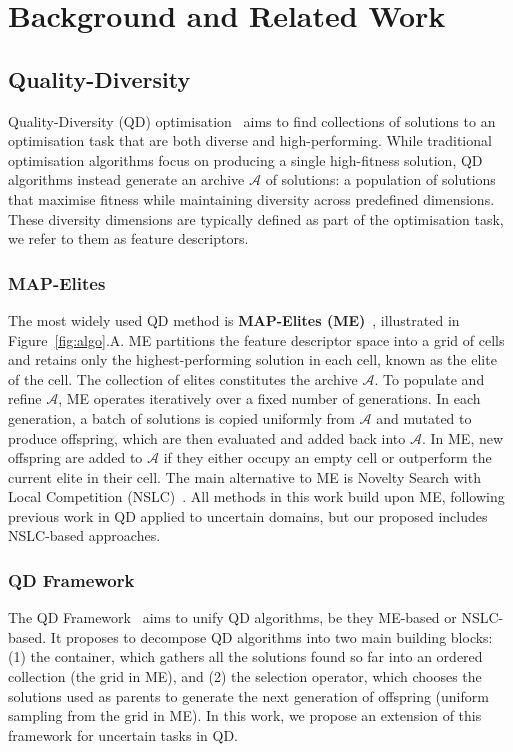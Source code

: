 \section{Background and Related Work}


\subsection{Quality-Diversity} \label{sec:qd}

Quality-Diversity (QD) optimisation~\cite{book_chapter, pugh, framework} aims to find collections of solutions to an optimisation task that are both diverse and high-performing. While traditional optimisation algorithms focus on producing a single high-fitness solution, QD algorithms instead generate an archive $\mathcal{A}$ of solutions: a population of solutions that maximise fitness while maintaining diversity across predefined dimensions. These diversity dimensions are typically defined as part of the optimisation task, we refer to them as feature descriptors.

\subsubsection{MAP-Elites} The most widely used QD method is \textbf{MAP-Elites (ME)}~\cite{map_elites}, illustrated in Figure~\ref{fig:algo}.A. ME partitions the feature descriptor space into a grid of cells and retains only the highest-performing solution in each cell, known as the elite of the cell. The collection of elites constitutes the archive $\mathcal{A}$. To populate and refine $\mathcal{A}$, ME operates iteratively over a fixed number of generations. In each generation, a batch of solutions is copied uniformly from $\mathcal{A}$ and mutated to produce offspring, which are then evaluated and added back into $\mathcal{A}$. 
In ME, new offspring are added to $\mathcal{A}$ if they either occupy an empty cell or outperform the current elite in their cell. 
The main alternative to ME is Novelty Search with Local Competition (NSLC)~\cite{lehman2011evolving}. 
All methods in this work build upon ME, following previous work in QD applied to uncertain domains, but our proposed \framework{} includes NSLC-based approaches. 

\subsubsection{QD Framework} \label{sec:qd_framework}
The QD Framework~\cite{framework} aims to unify QD algorithms, be they ME-based or NSLC-based. It proposes to decompose QD algorithms into two main building blocks: (1) the container, which gathers all the solutions found so far into an ordered collection (the grid in ME), and (2) the selection operator, which chooses the solutions used as parents to generate the next generation of offspring (uniform sampling from the grid in ME).
In this work, we propose an extension of this framework for uncertain tasks in QD. 

